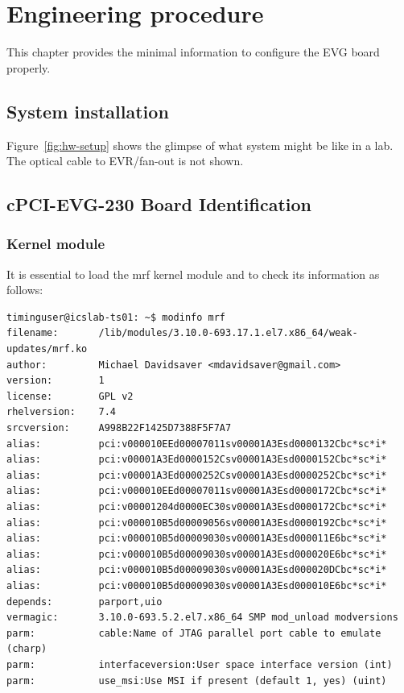 \documentclass[11pt
  , a4paper
  , article
  , oneside
  , showtrims
]{memoir}
\begin{document}
\clearpage
\chapter{Engineering procedure}
This chapter provides the minimal information to configure the EVG board properly.

\section{System installation}
Figure~\ref{fig:hw-setup} shows the glimpse of what system might be like in a lab. The optical cable to EVR/fan-out is not shown.

\section{cPCI-EVG-230 Board Identification}

\subsection{Kernel module}
It is essential to load the mrf kernel module and to check its information as follows:
\begin{lstlisting}[style=termstyle]
timinguser@icslab-ts01: ~$ modinfo mrf
filename:       /lib/modules/3.10.0-693.17.1.el7.x86_64/weak-updates/mrf.ko
author:         Michael Davidsaver <mdavidsaver@gmail.com>
version:        1
license:        GPL v2
rhelversion:    7.4
srcversion:     A998B22F1425D7388F5F7A7
alias:          pci:v000010EEd00007011sv00001A3Esd0000132Cbc*sc*i*
alias:          pci:v00001A3Ed0000152Csv00001A3Esd0000152Cbc*sc*i*
alias:          pci:v00001A3Ed0000252Csv00001A3Esd0000252Cbc*sc*i*
alias:          pci:v000010EEd00007011sv00001A3Esd0000172Cbc*sc*i*
alias:          pci:v00001204d0000EC30sv00001A3Esd0000172Cbc*sc*i*
alias:          pci:v000010B5d00009056sv00001A3Esd0000192Cbc*sc*i*
alias:          pci:v000010B5d00009030sv00001A3Esd000011E6bc*sc*i*
alias:          pci:v000010B5d00009030sv00001A3Esd000020E6bc*sc*i*
alias:          pci:v000010B5d00009030sv00001A3Esd000020DCbc*sc*i*
alias:          pci:v000010B5d00009030sv00001A3Esd000010E6bc*sc*i*
depends:        parport,uio
vermagic:       3.10.0-693.5.2.el7.x86_64 SMP mod_unload modversions
parm:           cable:Name of JTAG parallel port cable to emulate (charp)
parm:           interfaceversion:User space interface version (int)
parm:           use_msi:Use MSI if present (default 1, yes) (uint)
\end{lstlisting}
\end{document}
